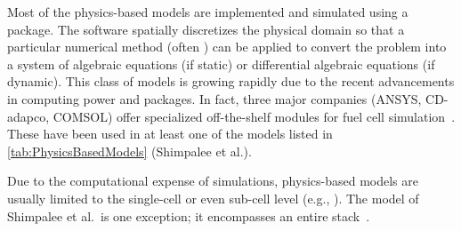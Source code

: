 Most of the physics-based models are implemented and simulated using a  package.  The  software spatially discretizes the physical domain so that a particular numerical method (often ) can be applied to convert the problem into a system of algebraic equations (if static) or differential algebraic equations (if dynamic).  This class of  models is growing rapidly due to the recent advancements in computing power and  packages.  In fact, three major  companies (ANSYS, CD-adapco, COMSOL) offer specialized off-the-shelf modules for fuel cell simulation~\cite{ANSYS12.0FC, CDadapcoFC, COMSOLFC}.  These have been used in at least one of the models listed in \autoref{tab:PhysicsBasedModels} (Shimpalee et al.).

Due to the computational expense of  simulations, physics-based  models are usually limited to the single-cell or even sub-cell level (e.g., ).  The model of Shimpalee et al.\ is one exception; it encompasses an entire stack~\cite{Shimpalee2009}.

